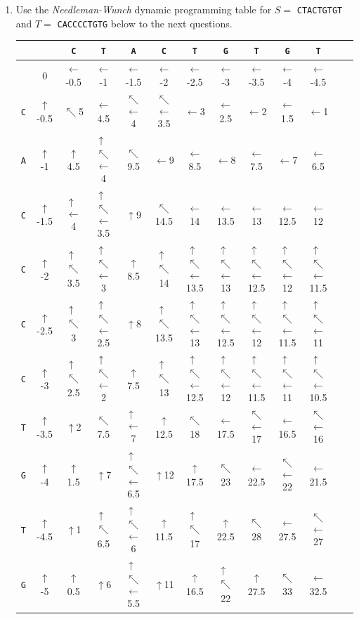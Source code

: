 \documentclass[11pt, oneside]{article}   	%
\newcommand{\diru}{$\uparrow$}
\newcommand{\dirl}{$\leftarrow$}
\newcommand{\dird}{$\nwarrow$}
\newcommand{\dirdl}{$\substack{\nwarrow\\\leftarrow}$}
\newcommand{\dirdu}{$\substack{\uparrow\\\nwarrow}$}
\newcommand{\dirlu}{$\substack{\uparrow\\\leftarrow}$}
\newcommand{\dirdlu}{$\substack{\uparrow\\\nwarrow\\\leftarrow}$}
\begin{document}
\clearpage
\begin{enumerate}
\item Use the \textit{Needleman-Wunch} dynamic programming table for $S = $ \texttt{CTACTGTGT} and $T = $ \texttt{CACCCCTGTG} below to the next questions.
%
\renewcommand{\arraystretch}{2}
\begin{center}
{\footnotesize
\begin{tabular}{|c||c|c|c|c|c|c|c|c|c|c|c|c|}
\hline
& & \texttt{C} &  \texttt{T} &  \texttt{A} &  \texttt{C} &  \texttt{T} &  \texttt{G} &  \texttt{T} &  \texttt{G} &  \texttt{T}\\
\hline
\hline
&  0 &	  \dirl -0.5 &	 \dirl  -1 &	\dirl -1.5 &	\dirl -2 &	\dirl -2.5 &	\dirl -3 &	\dirl -3.5 &	\dirl -4 &	\dirl -4.5 \\[1ex]
\hline
\texttt{C} &  \diru -0.5 &	 \dird 5  &	 \dirl 4.5 &	\dirdl 4 &	\dirdl 3.5 &	\dirl 3 &		\dirl 2.5 &	\dirl 2 &		\dirl 1.5 &	\dirl 1 \\[1ex]
\hline 
\texttt{A} &  \diru -1 & 	\diru 4.5 & 	 \dirdlu 4 &    \dird 9.5 & \dirl 9 &		\dirl 8.5 &	\dirl 8 &		\dirl 7.5 &	\dirl 7 &		\dirl 6.5\\[1ex]
\hline
\texttt{C} &  \diru -1.5 & 	\dirlu 4 & \dirdlu 3.5 & \diru 9 &  \dird 14.5 & \dirl 14 & \dirl 13.5 & \dirl 13 & \dirl 12.5 & \dirl 12 \\[1ex]
\hline 
\texttt{C} &  \diru -2 & \dirdu 3.5 & \dirdlu 3 & \diru 8.5 &   \dirdu 14 & \dirdlu 13.5 & \dirdlu 13 & \dirdlu 12.5 & \dirdlu 12 & \dirdlu 11.5 \\[1ex]
\hline 
\texttt{C} &  \diru -2.5 & \dirdu 3 & \dirdlu 2.5 & \diru 8 &   \dirdu 13.5 & \dirdlu 13 & \dirdlu 12.5 & \dirdlu 12 & \dirdlu 11.5 & \dirdlu 11 \\[1ex]
\hline 
\texttt{C} &  \diru -3 & \dirdu 2.5 & \dirdlu 2 & \diru 7.5 &   \dirdu 13 & \dirdlu 12.5 & \dirdlu 12 & \dirdlu 11.5 & \dirdlu 11 & \dirdlu 10.5 \\[1ex]
\hline  
\texttt{T} &  \diru -3.5 & \diru 2 & \dird 7.5 & \dirlu 7 & \diru 12.5 &   \dird 18 & \dirl 17.5 & \dirdl 17 & \dirl 16.5 & \dirdl 16  \\[1ex]
\hline 
\texttt{G} &  \diru -4 & \diru 1.5 & \diru 7 & \dirdlu 6.5 & \diru 12 & \diru 17.5 &   \dird 23 & \dirl 22.5 & \dirdl 22 & \dirl 21.5 \\[1ex]
\hline 
\texttt{T} &  \diru -4.5 & \diru 1 & \dirdu 6.5 & \dirdlu 6 & \diru 11.5 & \dirdu 17 & \diru 22.5 &   \dird 28 & \dirl 27.5 & \dirdl 27 \\[1ex]
\hline 
\texttt{G} &  \diru -5 & \diru 0.5 & \diru 6 & \dirdlu 5.5 & \diru 11 & \diru 16.5 & \dirdu 22 & \diru 27.5 &  \dird 33 &  \dirl 32.5 \\[1ex]

\end{tabular}}
\end{center}
\end{enumerate}
\end{document}
